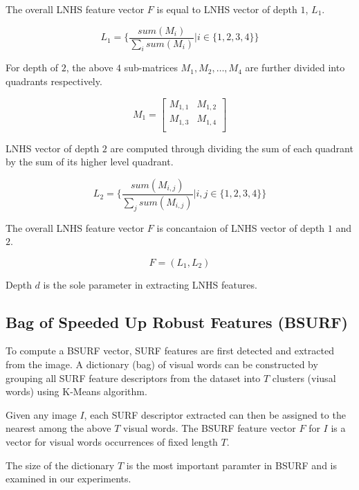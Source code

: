 The overall LNHS feature vector $F$ is equal to LNHS vector of depth $1$, $L_1$.

\begin{equation}
L_1 = \{\frac{sum(M_i)}{\sum_i sum(M_i)} | i \in \{1, 2, 3, 4\} \}
\end{equation}


For depth of $2$, the above $4$ sub-matrices $M_{1}, M_{2}, \dots, M_{4}$ are further divided into quadrants respectively.

\begin{equation}
M_{1} = 
\begin{bmatrix}
  M_{1,1}&  M_{1,2}\\
  M_{1,3}&  M_{1,4}\\
\end{bmatrix}
\end{equation}

LNHS vector of depth $2$ are computed through dividing the sum of each quadrant by the sum of its higher level quadrant.

\begin{equation}
L_2 = \{\frac{sum(M_{i,j})}{\sum_j sum(M_{i,j})} | i,j \in \{1, 2, 3, 4\}\}
\end{equation}

The overall LNHS feature vector $F$ is concantaion of LNHS vector of depth $1$ and $2$.

\begin{equation}
F = (L_1, L_2)
\end{equation}

Depth $d$ is the sole parameter in extracting LNHS features.

\subsection{Bag of Speeded Up Robust Features (BSURF)}
To compute a BSURF vector, SURF features \citep{bay2006surf} are first detected and extracted from the image.
A dictionary (bag) of visual words can be constructed by grouping all SURF feature descriptors from the dataset into $T$ clusters (viusal words) using K-Means algorithm.

Given any image $I$, each SURF descriptor extracted can then be assigned to the nearest among the above $T$ visual words.
The BSURF feature vector $F$ for $I$ is a vector for visual words occurrences of fixed length $T$.

The size of the dictionary $T$ is the most important paramter in BSURF and is examined in our experiments.



